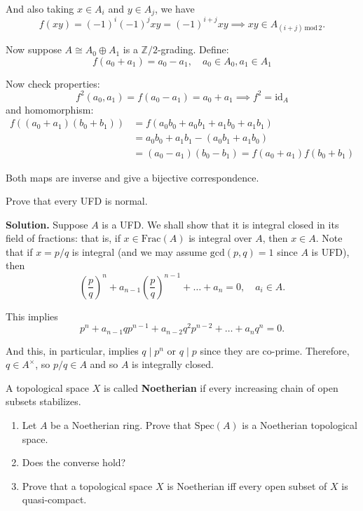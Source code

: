 \documentclass{template}
\begin{document}
And also taking $x \in A_i$ and $y \in A_j$, we have
\begin{equation*}
    f(xy) = (-1)^i(-1)^jxy = (-1)^{i+j}xy \implies xy \in A_{(i+j)\,\text{mod}\,2}.
\end{equation*}

Now suppose $A \cong A_0 \oplus A_1$ is a $\mathbb{Z}/2$-grading. Define:
\begin{equation*}
    f(a_0 + a_1) = a_0 - a_1, \quad a_0 \in A_0, a_1 \in A_1
\end{equation*}

Now check properties:
\begin{equation*}
    f^2(a_0,a_1) = f(a_0 - a_1) = a_0 + a_1 \implies f^2 = \text{id}_A
\end{equation*}
and homomorphism:
\begin{align*}
    f((a_0+a_1)(b_0+b_1)) &= f(a_0b_0+a_0b_1+a_1b_0+a_1b_1)\\
    &= a_0b_0+a_1b_1 - (a_0b_1+a_1b_0) \\
    &= (a_0-a_1)(b_0-b_1) = f(a_0+a_1)f(b_0+b_1)
\end{align*}

Both maps are inverse and give a bijective correspondence.

\begin{problem}[Exercise 3]
    Prove that every UFD is normal.
\end{problem}

\textbf{Solution.} Suppose $A$ is a UFD. We shall show that it is integral
closed in its field of fractions: that is, if $x \in \text{Frac}(A)$ is integral
over $A$, then $x \in A$. Note that if $x=p/q$ is integral (and we may assume
$\text{gcd}(p,q)=1$ since $A$ is UFD), then
\begin{equation*}
    \left(\frac{p}{q}\right)^n + a_{n-1}\left(\frac{p}{q}\right)^{n-1} + \dots + a_n = 0, \quad a_i \in A.
\end{equation*}

This implies
\begin{equation*}
    p^n + a_{n-1}qp^{n-1} + a_{n-2}q^2p^{n-2} + \dots + a_nq^n = 0.
\end{equation*}

And this, in particular, implies $q \mid p^n$ or $q \mid p$ since they are
co-prime. Therefore, $q \in A^{\times}$, so $p/q \in A$ and so $A$ is integrally closed.

\begin{problem}[Exercise 4]
    A topological space $X$ is called \textbf{Noetherian} if every increasing 
    chain of open subsets stabilizes.
    \begin{enumerate}
        \item[(a)] Let $A$ be a Noetherian ring. Prove that $\text{Spec}(A)$ is 
        a Noetherian topological space.
        \item[(b)] Does the converse hold?
        \item[(c)] Prove that a topological space $X$ is Noetherian iff every 
        open subset of $X$ is quasi-compact. 
    \end{enumerate}
\end{problem}
\end{document}
